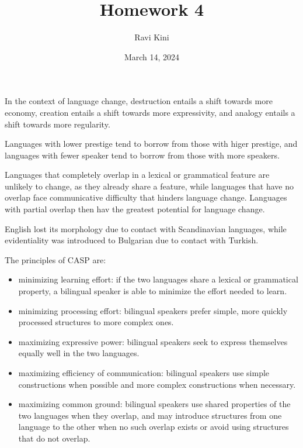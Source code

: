 \documentclass{article}
\title{Homework 4}
\author{Ravi Kini}
\date{March 14, 2024}
\begin{document}
\maketitle

\problem
In the context of language change, destruction entails a shift towards more economy, creation entails a shift towards more expressivity, and analogy entails a shift towards more regularity.

\clearpage

\problem
Languages with lower prestige tend to borrow from those with higer prestige, and languages with fewer speaker tend to borrow from those with more speakers.

\clearpage

\problem
Languages that completely overlap in a lexical or grammatical feature are unlikely to change, as they already share a feature, while languages that have no overlap face communicative difficulty that hinders language change. Languages with partial overlap then hav the greatest potential for language change.

\clearpage

\problem
English lost its morphology due to contact with Scandinavian languages, while evidentiality was introduced to Bulgarian due to contact with Turkish.

\clearpage

\problem
The principles of CASP are:
\begin{itemize}
    \item minimizing learning effort: if the two languages share a lexical or grammatical property, a bilingual speaker is able to minimize the effort needed to learn.
    \item minimizing processing effort: bilingual speakers prefer simple, more quickly processed structures to more complex ones.
    \item maximizing expressive power: bilingual speakers seek to express themselves equally well in the two languages.
    \item maximizing efficiency of communication: bilingual speakers use simple constructions when possible and more complex constructions when necessary.
    \item maximizing common ground: bilingual speakers use shared properties of the two languages when they overlap, and may introduce structures from one language to the other when no such overlap exists or avoid using structures that do not overlap.
\end{itemize}
\end{document}
